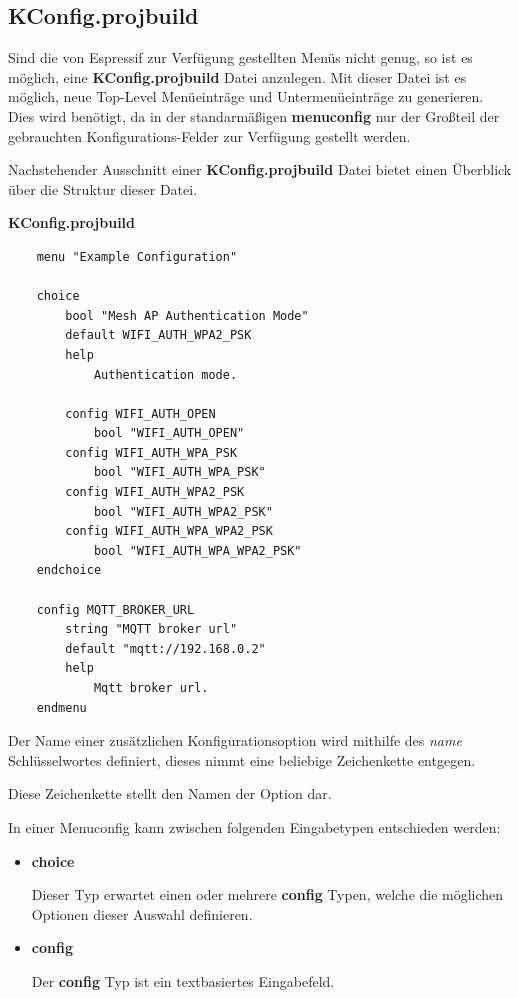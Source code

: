 \subsection{KConfig.projbuild}\label{sec:esp-idf-projbuild}
Sind die von Espressif zur Verfügung gestellten Menüs nicht genug, so ist es möglich, eine \textbf{KConfig.projbuild} Datei anzulegen. Mit dieser Datei ist es möglich, neue Top-Level Menüeinträge und Untermenüeinträge zu generieren. Dies wird benötigt, da in der standarmäßigen \textbf{menuconfig} nur der Großteil der gebrauchten Konfigurations-Felder zur Verfügung gestellt werden. 

Nachstehender Ausschnitt einer \textbf{KConfig.projbuild} Datei bietet einen Überblick über die Struktur dieser Datei.

\pagebreak
\textbf{KConfig.projbuild}
\begin{verbatim}
    menu "Example Configuration"

    choice
        bool "Mesh AP Authentication Mode"
        default WIFI_AUTH_WPA2_PSK
        help
            Authentication mode.

        config WIFI_AUTH_OPEN
            bool "WIFI_AUTH_OPEN"
        config WIFI_AUTH_WPA_PSK
            bool "WIFI_AUTH_WPA_PSK"
        config WIFI_AUTH_WPA2_PSK
            bool "WIFI_AUTH_WPA2_PSK"
        config WIFI_AUTH_WPA_WPA2_PSK
            bool "WIFI_AUTH_WPA_WPA2_PSK"
    endchoice

    config MQTT_BROKER_URL
        string "MQTT broker url"
        default "mqtt://192.168.0.2"
        help
            Mqtt broker url.
    endmenu
\end{verbatim}

Der Name einer zusätzlichen Konfigurationsoption wird mithilfe des \textit{name} Schlüsselwortes definiert, dieses nimmt eine beliebige Zeichenkette entgegen.

Diese Zeichenkette stellt den Namen der Option dar.

In einer Menuconfig kann zwischen folgenden Eingabetypen entschieden werden:

\begin{itemize}
    \item \textbf{choice}
    
    Dieser Typ erwartet einen oder mehrere \textbf{config} Typen, welche die möglichen Optionen dieser Auswahl definieren.
    \item \textbf{config}
    
    Der \textbf{config} Typ ist ein textbasiertes Eingabefeld.
\end{itemize}


